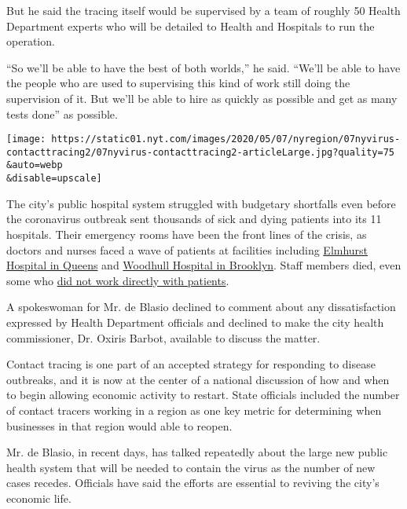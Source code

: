 But he said the tracing itself would be supervised by a team of roughly
50 Health Department experts who will be detailed to Health and
Hospitals to run the operation.

``So we'll be able to have the best of both worlds,'' he said. ``We'll
be able to have the people who are used to supervising this kind of work
still doing the supervision of it. But we'll be able to hire as quickly
as possible and get as many tests done'' as possible.

\texttt{[image: https://static01.nyt.com/images/2020/05/07/nyregion/07nyvirus-contacttracing2/07nyvirus-contacttracing2-articleLarge.jpg?quality=75\\\&auto=webp\\\&disable=upscale]}

The city's public hospital system struggled with budgetary shortfalls
even before the coronavirus outbreak sent thousands of sick and dying
patients into its 11 hospitals. Their emergency rooms have been the
front lines of the crisis, as doctors and nurses faced a wave of
patients at facilities including
\href{https://www.nytimes.com/2020/03/25/nyregion/nyc-coronavirus-hospitals.html}{Elmhurst
Hospital in Queens} and
\href{https://www.nytimes.com/2020/04/15/nyregion/coronavirus-woodhull-madhvi-aya-dead.html}{Woodhull
Hospital in Brooklyn}. Staff members died, even some who
\href{https://www.nytimes.com/2020/05/04/nyregion/coronavirus-ny-hospital-workers.html}{did
not work directly with patients}.

A spokeswoman for Mr. de Blasio declined to comment about any
dissatisfaction expressed by Health Department officials and declined to
make the city health commissioner, Dr. Oxiris Barbot, available to
discuss the matter.

Contact tracing is one part of an accepted strategy for responding to
disease outbreaks, and it is now at the center of a national discussion
of how and when to begin allowing economic activity to restart. State
officials included the number of contact tracers working in a region as
one key metric for determining when businesses in that region would able
to reopen.

Mr. de Blasio, in recent days, has talked repeatedly about the large new
public health system that will be needed to contain the virus as the
number of new cases recedes. Officials have said the efforts are
essential to reviving the city's economic life.

\href{https://www.nytimes.com/news-event/coronavirus?action=click\&pgtype=Article\&state=default\&region=MAIN_CONTENT_3\&context=storylines_faq}{}


